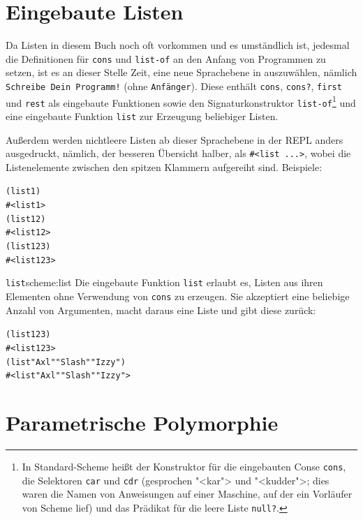 \section{Eingebaute Listen}

Da Listen in diesem Buch noch oft vorkommen und es umständlich
ist, jedesmal die Definitionen für \texttt{cons} und \texttt{list-of} an den Anfang
von Programmen zu setzen, ist es an dieser Stelle Zeit, eine neue
Sprachebene in \drscheme{} auszuwählen, nämlich \texttt{Schreibe Dein Programm!}
(ohne \texttt{Anfänger}).  Diese enthält \texttt{cons},
\texttt{cons?}, \texttt{first} und \texttt{rest} als eingebaute
Funktionen sowie den Signaturkonstruktor \texttt{list-of}\footnote{In Standard-Scheme heißt der Konstruktor für
  die eingebauten Conse \texttt{cons}, die
  Selektoren \texttt{car} und \texttt{cdr}
  (gesprochen "<kar"> und "<kudder">; dies waren die Namen von Anweisungen auf einer
  Maschine, auf der ein Vorläufer von Scheme lief) und das Prädikat
  für die leere Liste \texttt{null?}.} und eine
eingebaute Funktion \texttt{list} zur Erzeugung beliebiger Listen.

Außerdem werden nichtleere Listen ab dieser Sprachebene in der REPL
anders ausgedruckt, nämlich, der besseren Übersicht halber, als
\verb|#<list ...>|,
wobei die Listenelemente zwischen den spitzen Klammern aufgereiht sind.
Beispiele:

\begin{alltt}
(list 1)
\evalsto{} #<list 1>
(list 1 2)
\evalsto{} #<list 1 2>
(list 1 2 3)
\evalsto{} #<list 1 2 3>
\end{alltt}
%
\begin{feature}{\texttt{list}}{scheme:list}
  Die eingebaute Funktion \texttt{list} erlaubt es, Listen aus ihren Elementen
  ohne Verwendung von \texttt{cons} zu erzeugen.  Sie
  akzeptiert eine beliebige Anzahl von Argumenten, macht daraus eine
  Liste und gibt diese zurück:
%
\begin{alltt}
(list 1 2 3)
\evalsto{} #<list 1 2 3>
(list "Axl" "Slash" "Izzy")
\evalsto{} #<list "Axl" "Slash" "Izzy">
\end{alltt}
\end{feature}


\section{Parametrische Polymorphie}
\label{sec:parametric-polymorphism}
\label{sec:more-lists}


